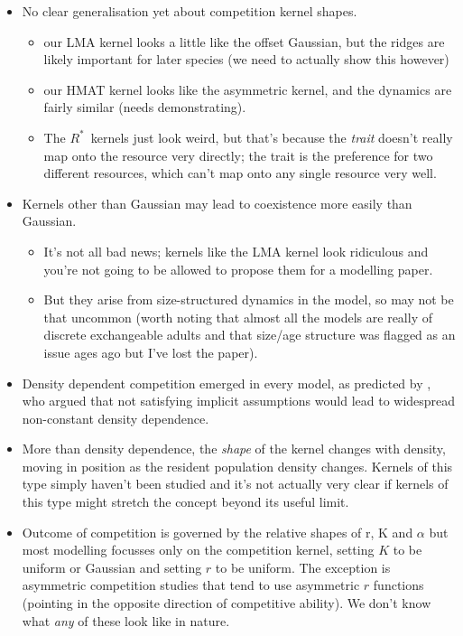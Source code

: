 \documentclass[a4paper,11pt]{article}
\newcommand{\Rstar}{\ensuremath{R^*}}
\begin{document}
\begin{itemize}
\item No clear generalisation yet about competition kernel shapes.
  \begin{itemize}
  \item our LMA kernel looks a little like the
    \citet{Roughgarden-1979} offset Gaussian, but the ridges are
    likely important for later species (we need to actually show this
    however)
  \item our HMAT kernel looks like the \citet{Kisdi-1999} asymmetric
    kernel, and the dynamics are fairly similar (needs
    demonstrating).
  \item The \Rstar\ kernels just look weird, but that's because the
    \emph{trait} doesn't really map onto the resource very directly;
    the trait is the preference for two different resources, which
    can't map onto any single resource very well.
  \end{itemize}
\item Kernels other than Gaussian may lead to coexistence more easily
  than Gaussian.
  \begin{itemize}
  \item It's not all bad news; kernels like the LMA kernel look
    ridiculous and you're not going to be allowed to propose them for
    a modelling paper.
  \item But they arise from size-structured dynamics in the model, so
    may not be that uncommon (worth noting that almost all the models
    are really of discrete exchangeable adults and that size/age
    structure was flagged as an issue ages ago but I've lost the
    paper).
  \end{itemize}
\item Density dependent competition emerged in every model, as
  predicted by \citet{Abrams-1980}, who argued that not satisfying
  implicit assumptions would lead to widespread non-constant density
  dependence.
\item More than density dependence, the \emph{shape} of the kernel
  changes with density, moving in position as the resident population
  density changes.  Kernels of this type simply haven't been studied
  and it's not actually very clear if kernels of this type might
  stretch the concept beyond its useful limit.
\item Outcome of competition is governed by the relative shapes of r,
  K and $\alpha$ but most modelling focusses only on the competition
  kernel, setting $K$ to be uniform or Gaussian and setting $r$ to be
  uniform.  The exception is asymmetric competition studies that tend
  to use asymmetric $r$ functions (pointing in the opposite direction
  of competitive ability). We don't know what \emph{any} of these look
  like in nature.
\end{itemize}
\end{document}
